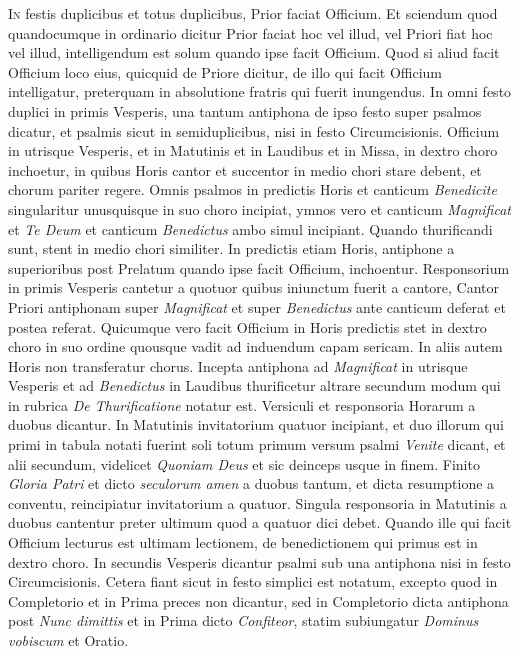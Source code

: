 \begin{multicols*}{2}
{\color{Red} }
\lettrine[lines=2]{\zallmancaps \color{Red} I}{n} festis duplicibus et totus duplicibus, Prior faciat Officium. Et sciendum quod quandocumque in ordinario dicitur Prior faciat hoc vel illud, vel Priori fiat hoc vel illud, intelligendum est solum quando ipse facit Officium. Quod si aliud facit Officium loco eius, quicquid de Priore dicitur, de illo qui facit Officium intelligatur, preterquam in absolutione fratris qui fuerit inungendus.
In omni festo duplici in primis Vesperis, una tantum antiphona de ipso festo super psalmos dicatur, et psalmis sicut in semiduplicibus, nisi in festo Circumcisionis. Officium in utrisque Vesperis, et in Matutinis et in Laudibus et in Missa, in dextro choro inchoetur, in quibus Horis cantor et succentor in medio chori stare debent, et chorum pariter regere. Omnis psalmos in predictis Horis et canticum \textit{Benedicite} singularitur unusquisque in suo choro incipiat, ymnos vero et canticum \textit{Magnificat} et \textit{Te Deum} et canticum \textit{Benedictus} ambo simul incipiant. Quando thurificandi sunt, stent in medio chori similiter. In predictis etiam Horis, antiphone a superioribus post Prelatum quando ipse facit Officium, inchoentur. Responsorium in primis Vesperis cantetur a quotuor quibus iniunctum fuerit a cantore, Cantor Priori antiphonam super \textit{Magnificat} et super \textit{Benedictus} ante canticum deferat et postea referat. Quicumque vero facit Officium in Horis predictis stet in dextro choro in suo ordine quousque vadit ad induendum capam sericam. In aliis autem Horis non transferatur chorus. Incepta antiphona ad \textit{Magnificat} in utrisque Vesperis et ad \textit{Benedictus} in Laudibus thurificetur altrare secundum modum qui in rubrica \textit{De Thurificatione} notatur est.
Versiculi et responsoria Horarum a duobus dicantur. In Matutinis invitatorium quatuor incipiant, et duo illorum qui primi in tabula notati fuerint soli totum primum versum psalmi \textit{Venite} dicant, et alii secundum, videlicet \textit{Quoniam Deus} et sic deinceps usque in finem.
Finito \textit{Gloria Patri} et dicto \textit{seculorum amen} a duobus tantum, et dicta resumptione a conventu, reincipiatur invitatorium a quatuor.
Singula responsoria in Matutinis a duobus cantentur preter ultimum quod a quatuor dici debet. Quando ille qui facit Officium lecturus est ultimam lectionem, de benedictionem qui primus est in dextro choro. In secundis Vesperis dicantur psalmi sub una antiphona nisi in festo Circumcisionis.
Cetera fiant sicut in festo simplici est notatum, excepto quod in Completorio et in Prima preces non dicantur, sed in Completorio dicta antiphona post \textit{Nunc dimittis} et in Prima dicto \textit{Confiteor}, statim subiungatur \textit{Dominus vobiscum} et Oratio.


\end{multicols*}
